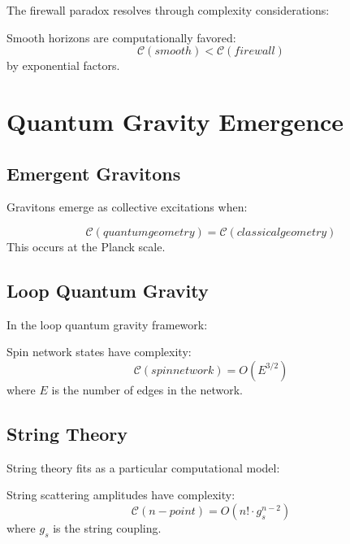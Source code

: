 \documentclass[12pt,a4paper]{article}
\newcommand{\comp}[1]{\mathcal{C}(#1)}
\begin{document}
The firewall paradox resolves through complexity considerations:

\begin{theorem}
Smooth horizons are computationally favored:
\begin{equation}
\comp{smooth} < \comp{firewall}
\end{equation}
by exponential factors.
\end{theorem}

\section{Quantum Gravity Emergence}

\subsection{Emergent Gravitons}

Gravitons emerge as collective excitations when:

\begin{proposition}
\begin{equation}
\comp{quantum geometry} = \comp{classical geometry}
\end{equation}
This occurs at the Planck scale.
\end{proposition}

\subsection{Loop Quantum Gravity}

In the loop quantum gravity framework:

\begin{theorem}
Spin network states have complexity:
\begin{equation}
\comp{spin network} = O(E^{3/2})
\end{equation}
where $E$ is the number of edges in the network.
\end{theorem}

\subsection{String Theory}

String theory fits as a particular computational model:

\begin{proposition}
String scattering amplitudes have complexity:
\begin{equation}
\comp{n-point} = O(n! \cdot g_s^{n-2})
\end{equation}
where $g_s$ is the string coupling.
\end{proposition}
\end{document}
